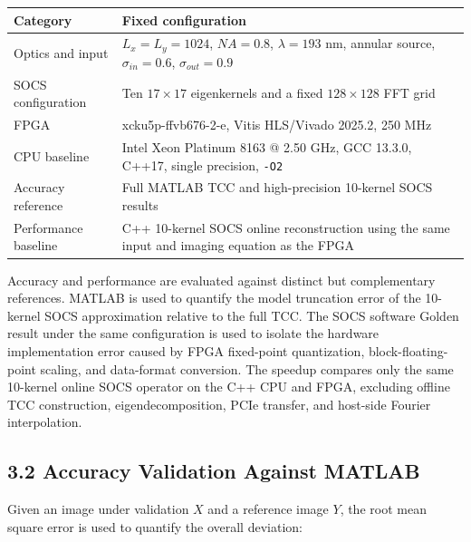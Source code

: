 \documentclass[
  preprint]{elsarticle}
\newcounter{none} %
\begin{document}
{\def\LTcaptype{none} %
\begin{longtable}[]{@{}
  >{\raggedright\arraybackslash}p{}
  >{\raggedright\arraybackslash}p{}@{}}
\toprule\noalign{}
\begin{minipage}[b]{\linewidth}\raggedright
Category
\end{minipage} & \begin{minipage}[b]{\linewidth}\raggedright
Fixed configuration
\end{minipage} \\
\midrule\noalign{}
\endhead
\bottomrule\noalign{}
\endlastfoot
Optics and input & \(L_x=L_y=1024\), \(NA=0.8\), \(\lambda=193\) nm,
annular source, \(\sigma_{in}=0.6\), \(\sigma_{out}=0.9\) \\
SOCS configuration & Ten \(17\times17\) eigenkernels and a fixed
\(128\times128\) FFT grid \\
FPGA & xcku5p-ffvb676-2-e, Vitis HLS/Vivado 2025.2, 250 MHz \\
CPU baseline & Intel Xeon Platinum 8163 @ 2.50 GHz, GCC 13.3.0, C++17,
single precision, \texttt{-O2} \\
Accuracy reference & Full MATLAB TCC and high-precision 10-kernel SOCS
results \\
Performance baseline & C++ 10-kernel SOCS online reconstruction using
the same input and imaging equation as the FPGA \\
\end{longtable}
}

Accuracy and performance are evaluated against distinct but
complementary references. MATLAB is used to quantify the model
truncation error of the 10-kernel SOCS approximation relative to the
full TCC. The SOCS software Golden result under the same configuration
is used to isolate the hardware implementation error caused by FPGA
fixed-point quantization, block-floating-point scaling, and data-format
conversion. The speedup compares only the same 10-kernel online SOCS
operator on the C++ CPU and FPGA, excluding offline TCC construction,
eigendecomposition, PCIe transfer, and host-side Fourier interpolation.

\subsection{3.2 Accuracy Validation Against
MATLAB}\label{accuracy-validation-against-matlab}

Given an image under validation \(X\) and a reference image \(Y\), the
root mean square error is used to quantify the overall deviation:
\end{document}
